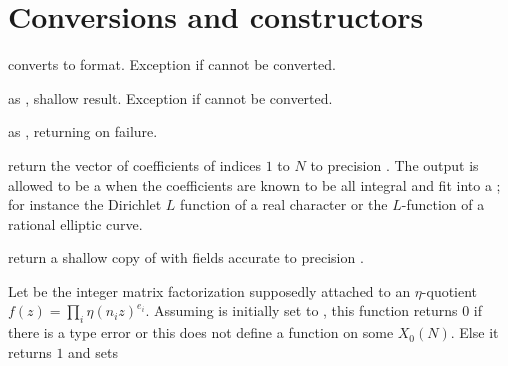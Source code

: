 








\section{Conversions and constructors}

 converts  to  format.
Exception if  cannot be converted.

 as ,
shallow result. Exception if  cannot be converted.

 as
, returning  on failure.



return the vector of coefficients of indices $1$ to $N$ to precision
. The output is allowed to be a  when the
coefficients are known to be all integral and fit into a ;
for instance the Dirichlet $L$ function of a real character or the
$L$-function of a rational elliptic curve.

return a shallow copy of  with fields accurate to precision
.

 Let  be the integer matrix factorization supposedly
attached to an $\eta$-quotient $f(z) = \prod_i \eta(n_i z)^{e_i}$. Assuming
 is initially set to , this function returns $0$ if
there is a type error or this does not define a function on some $X_0(N)$.
Else it returns $1$ and sets


